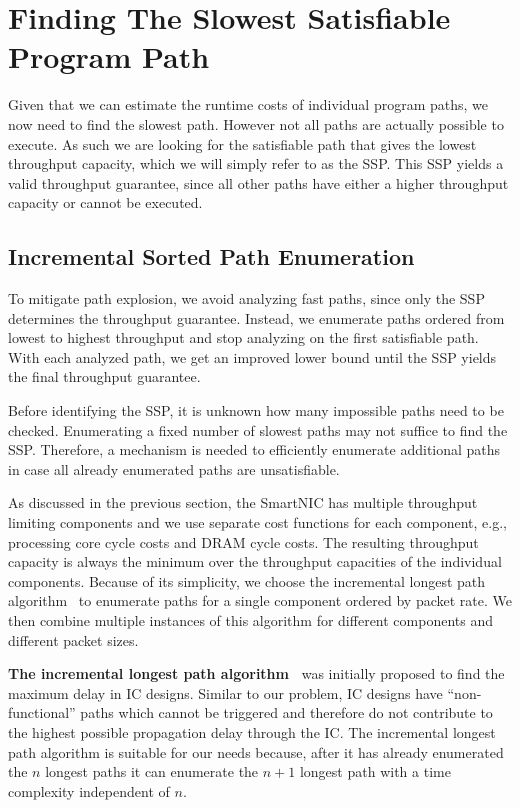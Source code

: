 \documentclass[10pt,letterpaper,sigconf,anonymous,nonacm,screen]{acmart}
\newcommand{\eg}{e.g.,}
\begin{document}
\section{Finding The Slowest Satisfiable Program Path}
\label{sec:path-enumeration}

Given that we can estimate the runtime costs of individual program paths, we now need to find the slowest path.
However not all paths are actually possible to execute.
As such we are looking for the satisfiable path that gives the lowest throughput capacity, which we will simply refer to as the \acf{SSP}.
This \ac{SSP} yields a valid throughput guarantee, since all other paths have either a higher throughput capacity or cannot be executed.


\subsection{Incremental Sorted Path Enumeration}
\label{subsec:path-enumeration}

To mitigate path explosion, we avoid analyzing fast paths, since only the \ac{SSP} determines the throughput guarantee.
Instead, we enumerate paths ordered from lowest to highest throughput and stop analyzing on the first satisfiable path.
With each analyzed path, we get an improved lower bound until the \ac{SSP} yields the final throughput guarantee.

Before identifying the \ac{SSP}, it is unknown how many impossible paths need to be checked.
Enumerating a fixed number of slowest paths may not suffice to find the \ac{SSP}.
Therefore, a mechanism is needed to efficiently enumerate additional paths in case all already enumerated paths are unsatisfiable.

As discussed in the previous section, the SmartNIC has multiple throughput limiting components and we use separate cost functions for each component, \eg{} processing core cycle costs and DRAM cycle costs.
The resulting throughput capacity is always the minimum over the throughput capacities of the individual components.
Because of its simplicity, we choose the incremental longest path algorithm~\cite{kundu94} to enumerate paths for a single component ordered by packet rate.
We then combine multiple instances of this algorithm for different components and different packet sizes.

\noindent\textbf{The incremental longest path algorithm~\cite{kundu94}} was initially proposed to find the maximum delay in \ac{IC} designs.
Similar to our problem, \ac{IC} designs have ``non-functional'' paths which cannot be triggered and therefore do not contribute to the highest possible propagation delay through the \ac{IC}.
The incremental longest path algorithm is suitable for our needs because, after it has already enumerated the $n$ longest paths it can enumerate the $n+1$ longest path with a time complexity independent of $n$.
\end{document}
